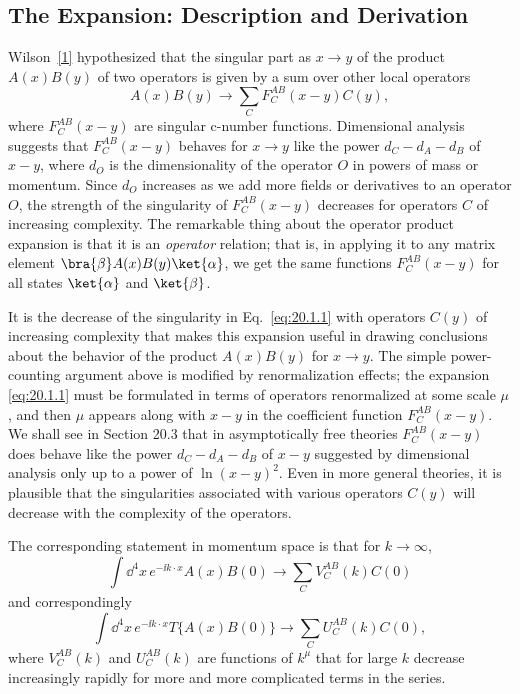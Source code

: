 \subsection{The Expansion: Description and Derivation}
\label{sec:20.1}

Wilson~\hyperref[ch20-ref-1]{[1]} hypothesized that the singular part as
$x\to y$ of the product $A(x)B(y)$ of two operators is given by a sum over
other local operators
\begin{equation}
 A(x)B(y)\longrightarrow
 \sum_C F_C^{AB}(x-y)C(y),
 \tag{20.1.1}\label{eq:20.1.1}
\end{equation}
where $F_C^{AB}(x-y)$ are singular c-number functions. Dimensional analysis
suggests that $F_C^{AB}(x-y)$ behaves for $x\to y$ like the power
$d_C-d_A-d_B$ of $x-y$, where $d_O$ is the dimensionality of the operator
$O$ in powers of mass or momentum. Since $d_O$ increases as we add more
fields or derivatives to an operator $O$, the strength of the singularity of
$F_C^{AB}(x-y)$ decreases for operators $C$ of increasing complexity. The
remarkable thing about the operator product expansion is that it is an
\emph{operator} relation; that is, in applying it to any matrix element
$\bra{\beta}A(x)B(y)\ket{\alpha}$, we get the same functions
$F_C^{AB}(x-y)$ for all states $\ket{\alpha}$ and $\ket{\beta}$.

It is the decrease of the singularity in Eq.~\eqref{eq:20.1.1} with
operators $C(y)$ of increasing complexity that makes this expansion useful
in drawing conclusions about the behavior of the product $A(x)B(y)$ for
$x\to y$. The simple power-counting argument above is modified by
renormalization effects; the expansion \eqref{eq:20.1.1} must be formulated
in terms of operators renormalized at some scale $\mu$, and then $\mu$
appears along with $x-y$ in the coefficient function $F_C^{AB}(x-y)$. We
shall see in Section 20.3 that in asymptotically free theories
$F_C^{AB}(x-y)$ does behave like the power $d_C-d_A-d_B$ of $x-y$
suggested by dimensional analysis only up to a power of $\ln(x-y)^2$. Even
in more general theories, it is plausible that the singularities associated
with various operators $C(y)$ will decrease with the complexity of the
operators.

The corresponding statement in momentum space is that for $k\to\infty$,
\begin{equation}
 \int \dd^4x\,e^{-\ii k\cdot x}A(x)B(0)
 \longrightarrow \sum_C V_C^{AB}(k)C(0)
 \tag{20.1.2}\label{eq:20.1.2}
\end{equation}
and correspondingly
\begin{equation}
 \int \dd^4x\,e^{-\ii k\cdot x}T\{A(x)B(0)\}
 \longrightarrow \sum_C U_C^{AB}(k)C(0),
 \tag{20.1.3}\label{eq:20.1.3}
\end{equation}
where $V_C^{AB}(k)$ and $U_C^{AB}(k)$ are functions of $k^\mu$ that for
large $k$ decrease increasingly rapidly for more and more complicated terms
in the series.

